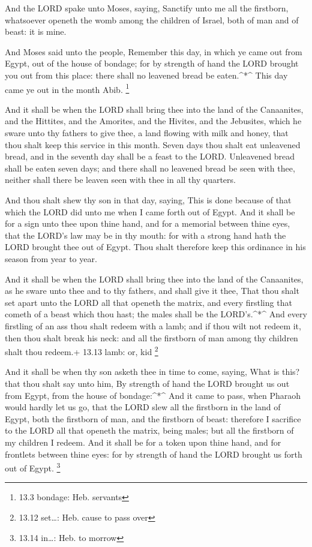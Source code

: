  And the LORD spake unto Moses, saying, 
Sanctify unto me all the firstborn, whatsoever openeth the womb among
the children of Israel, both of man and of beast: it is mine.

 And Moses said unto the people, Remember this day, in which
ye came out from Egypt, out of the house of bondage; for by strength of
hand the LORD brought you out from this place: there shall no leavened
bread be eaten.\^{}*\^{}  This day came ye out in the month
Abib. \footnote{13.3 bondage: Heb. servants}

 And it shall be when the LORD shall bring thee into the
land of the Canaanites, and the Hittites, and the Amorites, and the
Hivites, and the Jebusites, which he sware unto thy fathers to give
thee, a land flowing with milk and honey, that thou shalt keep this
service in this month.  Seven days thou shalt eat unleavened
bread, and in the seventh day shall be a feast to the LORD. 
Unleavened bread shall be eaten seven days; and there shall no leavened
bread be seen with thee, neither shall there be leaven seen with thee in
all thy quarters.

 And thou shalt shew thy son in that day, saying, This is
done because of that which the LORD did unto me when I came forth out of
Egypt.  And it shall be for a sign unto thee upon thine
hand, and for a memorial between thine eyes, that the LORD's law may be
in thy mouth: for with a strong hand hath the LORD brought thee out of
Egypt.  Thou shalt therefore keep this ordinance in his
season from year to year.

 And it shall be when the LORD shall bring thee into the
land of the Canaanites, as he sware unto thee and to thy fathers, and
shall give it thee,  That thou shalt set apart unto the
LORD all that openeth the matrix, and every firstling that cometh of a
beast which thou hast; the males shall be the LORD's.\^{}*\^{}
 And every firstling of an ass thou shalt redeem with a
lamb; and if thou wilt not redeem it, then thou shalt break his neck:
and all the firstborn of man among thy children shalt thou redeem.+
13.13 lamb: or, kid \footnote{13.12 set\ldots: Heb. cause to pass over}

 And it shall be when thy son asketh thee in time to come,
saying, What is this? that thou shalt say unto him, By strength of hand
the LORD brought us out from Egypt, from the house of bondage:\^{}*\^{}
 And it came to pass, when Pharaoh would hardly let us go,
that the LORD slew all the firstborn in the land of Egypt, both the
firstborn of man, and the firstborn of beast: therefore I sacrifice to
the LORD all that openeth the matrix, being males; but all the firstborn
of my children I redeem.  And it shall be for a token upon
thine hand, and for frontlets between thine eyes: for by strength of
hand the LORD brought us forth out of Egypt. \footnote{13.14 in\ldots:
  Heb. to morrow}

